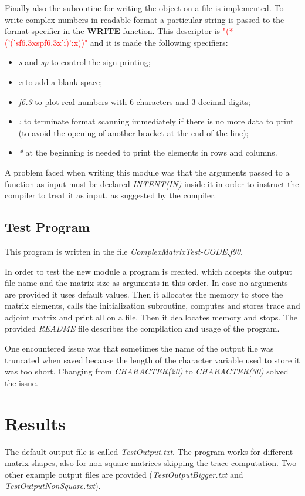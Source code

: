 \documentclass[11pt,a4paper]{article}
\begin{document}
Finally also the subroutine for writing the object on a file is implemented. 
To write complex numbers in readable format a particular string is passed to the format specifier in the \textbf{WRITE} function.
This descriptor is \textcolor{red}{"(*('('sf6.3xspf6.3x'i)':x))"} and it is made the following specifiers:
\begin{itemize}
	\item \textit{s} and \textit{sp} to control the sign printing;
	\item \textit{x} to add a blank space;
	\item \textit{f6.3} to plot real numbers with 6 characters and 3 decimal digits;
	\item \textit{:} to terminate format scanning immediately if there is no more data to print (to avoid the opening of another bracket at the end of the line);
	\item \textit{*} at the beginning is needed to print the elements in rows and columns.
\end{itemize}
A problem faced when writing this module was that the arguments passed to a function as input must be declared \textit{INTENT(IN)} inside it in order to instruct the compiler to treat it as input, as suggested by the compiler.

\subsection{Test Program}
This program is written in the file \textit{ComplexMatrixTest-CODE.f90}.

In order to test the new module a program is created, which accepts the output file name and the matrix size as arguments in this order. 
In case no arguments are provided it uses default values.
Then it allocates the memory to store the matrix elements, calls the initialization subroutine, computes and stores trace and adjoint matrix and print all on a file. Then it deallocates memory and stops.
The provided \textit{README} file describes the compilation and usage of the program.

One encountered issue was that sometimes the name of the output file was truncated when saved because the length of the character variable used to store it was too short. Changing from \textit{CHARACTER(20)} to \textit{CHARACTER(30)} solved the issue.

\section{Results} %
The default output file is called \textit{TestOutput.txt}. 
The program works for different matrix shapes, also for non-square matrices skipping the trace computation. 
Two other example output files are provided (\textit{TestOutputBigger.txt} and \textit{TestOutputNonSquare.txt}).
\end{document}
